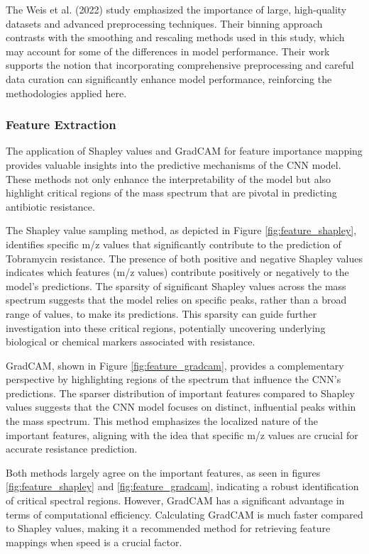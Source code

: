 \documentclass[english,11pt,a4paper,titlepage]{article}
\begin{document}
The Weis et al. (2022) \cite{weisDirectAntimicrobialResistance2022} study emphasized the importance of large, high-quality datasets and advanced preprocessing techniques. Their binning approach contrasts with the smoothing and rescaling methods used in this study, which may account for some of the differences in model performance. Their work supports the notion that incorporating comprehensive preprocessing and careful data curation can significantly enhance model performance, reinforcing the methodologies applied here.

\subsubsection*{Feature Extraction}
The application of Shapley values and GradCAM for feature importance mapping provides valuable insights into the predictive mechanisms of the CNN model. These methods not only enhance the interpretability of the model but also highlight critical regions of the mass spectrum that are pivotal in predicting antibiotic resistance.

The Shapley value sampling method, as depicted in Figure \ref{fig:feature_shapley}, identifies specific m/z values that significantly contribute to the prediction of Tobramycin resistance. The presence of both positive and negative Shapley values indicates which features (m/z values) contribute positively or negatively to the model's predictions. The sparsity of significant Shapley values across the mass spectrum suggests that the model relies on specific peaks, rather than a broad range of values, to make its predictions. This sparsity can guide further investigation into these critical regions, potentially uncovering underlying biological or chemical markers associated with resistance.

GradCAM, shown in Figure \ref{fig:feature_gradcam}, provides a complementary perspective by highlighting regions of the spectrum that influence the CNN's predictions. The sparser distribution of important features compared to Shapley values suggests that the CNN model focuses on distinct, influential peaks within the mass spectrum. This method emphasizes the localized nature of the important features, aligning with the idea that specific m/z values are crucial for accurate resistance prediction.

Both methods largely agree on the important features, as seen in figures \ref{fig:feature_shapley} and \ref{fig:feature_gradcam}, indicating a robust identification of critical spectral regions. However, GradCAM has a significant advantage in terms of computational efficiency. Calculating GradCAM is much faster compared to Shapley values, making it a recommended method for retrieving feature mappings when speed is a crucial factor.
\end{document}
